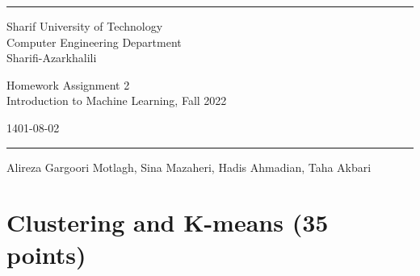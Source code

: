 \documentclass[a4paper]{article}
\begin{document}
	
	
	\fancyhead[C]{}
	\hrule \medskip %
	\begin{minipage}{0.295\textwidth} 
		\raggedright
		\footnotesize
		  Sharif University of Technology \hfill\\   
		Computer Engineering Department\hfill\\
		Sharifi-Azarkhalili
	\end{minipage}
	\begin{minipage}{0.4\textwidth} 
		\centering 
		\large 
		Homework Assignment 2\\ 
		\normalsize 
		Introduction to Machine Learning, Fall 2022\\ 
	\end{minipage}
	\begin{minipage}{0.295\textwidth} 
		\raggedleft
		\small
            1401-08-02
            \hfill\\
	\end{minipage}
	\medskip\hrule 
	\bigskip
	
        \begin{center}
            Alireza Gargoori Motlagh, Sina Mazaheri, Hadis Ahmadian, Taha Akbari
        \end{center}
        
        
        \section{Clustering and K-means (35 points)}
    
\end{document}
